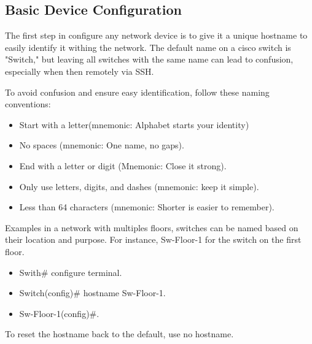 \documentclass[a4paper,11pt]{article}
\begin{document}
\subsection{Basic Device Configuration}
The first step in configure any network device is to give it a unique hostname to easily identify it withing the network. The default name on a cisco switch is "Switch," but leaving all switches with the same name can lead to confusion, especially when then remotely via SSH.\\

\begin{tcolorbox}[colframe=gray!80, colback=gray!20, coltitle=black, title= Hostname Guidelines]
     To avoid confusion and ensure easy identification, follow these naming conventions:\\
    \begin{itemize}
        \item Start with a letter(mnemonic: Alphabet starts your identity)\\
        \item No spaces (mnemonic: One name, no gaps).\\
        \item End with a letter or digit  (Mnemonic: Close it strong).\\
        \item Only use letters, digits, and dashes (mnemonic: keep it simple).\\
        \item Less than 64 characters (mnemonic: Shorter is easier to remember).\\
    \end{itemize}
\end{tcolorbox}


\begin{tcolorbox}[colframe=gray!80, colback=gray!20, coltitle=black, title= Example]
    Examples in a network with multiples floors, switches can be named based on their location and purpose. For instance, Sw-Floor-1 for the switch on the first floor.\\
    \begin{itemize}
        \item  Swith\# configure terminal.\\
        \item  Switch(config)\# hostname Sw-Floor-1.\\
        \item  Sw-Floor-1(config)\#.\\
    \end{itemize}
     To reset the hostname back to the default, use no hostname.\\
\end{tcolorbox}
\end{document}
